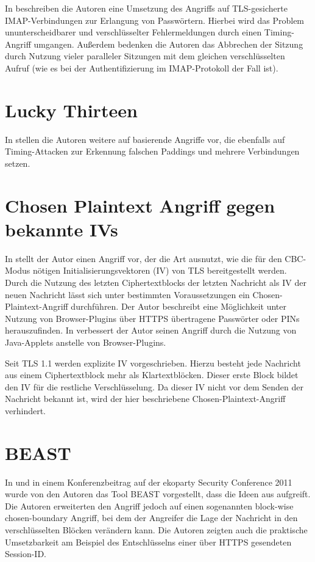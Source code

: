 In \cite{canvel03} beschreiben die Autoren eine Umsetzung des Angriffs auf TLS-gesicherte IMAP-Verbindungen zur Erlangung von Passwörtern. Hierbei wird das Problem ununterscheidbarer und verschlüsselter Fehlermeldungen durch einen Timing-Angriff umgangen. Außerdem bedenken die Autoren das Abbrechen der Sitzung durch Nutzung vieler paralleler Sitzungen mit dem gleichen verschlüsselten Aufruf (wie es bei der Authentifizierung im IMAP-Protokoll der Fall ist).


\section{Lucky Thirteen}

In \cite{paterson13} stellen die Autoren weitere auf \cite{vaudenay02} basierende Angriffe vor, die ebenfalls auf Timing-Attacken zur Erkennung falschen Paddings und mehrere Verbindungen setzen.

\section{Chosen Plaintext Angriff gegen bekannte IVs}

In \cite{bard04} stellt der Autor einen Angriff vor, der die Art ausnutzt, wie die für den CBC-Modus nötigen Initialisierungsvektoren (IV) von TLS bereitgestellt werden. Durch die Nutzung des letzten Ciphertextblocks der letzten Nachricht als IV der neuen Nachricht lässt sich unter bestimmten Voraussetzungen ein Chosen-Plaintext-Angriff durchführen. Der Autor beschreibt eine Möglichkeit unter Nutzung von Browser-Plugins über HTTPS übertragene Passwörter oder PINs herauszufinden. In \cite{bard06} verbessert der Autor seinen Angriff durch die Nutzung von Java-Applets anstelle von Browser-Plugins.

Seit TLS 1.1 werden explizite IV vorgeschrieben. Hierzu besteht jede Nachricht aus einem Ciphertextblock mehr als Klartextblöcken. Dieser erste Block bildet den IV für die restliche Verschlüsselung. Da dieser IV nicht vor dem Senden der Nachricht bekannt ist, wird der hier beschriebene Chosen-Plaintext-Angriff verhindert.

\section{BEAST}

In \cite{duong11} und in einem Konferenzbeitrag auf der ekoparty Security Conference 2011 wurde von den Autoren das Tool BEAST vorgestellt, dass die Ideen aus \cite{bard04} aufgreift. Die Autoren erweiterten den Angriff jedoch auf einen sogenannten block-wise chosen-boundary Angriff, bei dem der Angreifer die Lage der Nachricht in den verschlüsselten Blöcken verändern kann. Die Autoren zeigten auch die praktische Umsetzbarkeit am Beispiel des Entschlüsselns einer über HTTPS gesendeten Session-ID.

